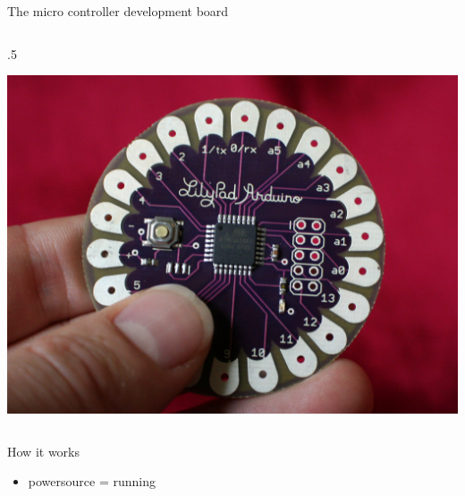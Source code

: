 \begin{frame}{The micro controller development board}
\begin{columns} [c,onlytextwidth]
		\begin{column} [c] {.5\textwidth}
			\begin{center}
				\includegraphics [width=.9\textwidth,keepaspectratio]{img/lilypad}
			\end{center}
		\end{column}
	\end{columns}
\end{frame}

\begin{frame}{How it works}
	\begin{itemize}
		\item powersource = running
	\end{itemize}
\end{frame}

